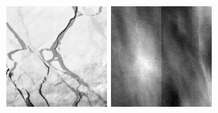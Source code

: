 \documentclass{article}
\begin{document}
            \begin{figure}[ht]
                \centering
                \begin{minipage}{0.25\hsize}
                    \centering
                    \includegraphics[width = 1\hsize]{lead_patch.png}
                    \includegraphics[width = 1\hsize]{cloud_patch.png}

\end{minipage}
\end{figure}
\end{document}
